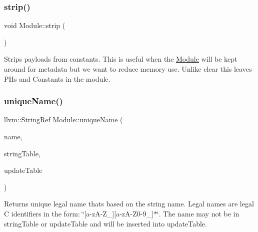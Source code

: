 \subsubsection{\texorpdfstring{strip()}{strip()}}
{\footnotesize\ttfamily void Module\+::strip (\begin{DoxyParamCaption}{ }\end{DoxyParamCaption})}

Strips payloads from constants. This is useful when the \hyperlink{classglow_1_1_module}{Module} will be kept around for metadata but we want to reduce memory use. Unlike clear this leaves P\+Hs and Constants in the module. \mbox{\label{classglow_1_1_module_a299f2b5203794b857dcb75d0ad069758}} 
\subsubsection{\texorpdfstring{unique\+Name()}{uniqueName()}}
{\footnotesize\ttfamily llvm\+::\+String\+Ref Module\+::unique\+Name (\begin{DoxyParamCaption}\item[{llvm\+::\+String\+Ref}]{name,  }\item[{const llvm\+::\+String\+Set$<$$>$ \&}]{string\+Table,  }\item[{llvm\+::\+String\+Set$<$$>$ \&}]{update\+Table }\end{DoxyParamCaption})\hspace{0.3cm}{\ttfamily [static]}}

\begin{DoxyReturn}{Returns}
unique legal name that\textquotesingle{}s based on the string {\ttfamily name}. Legal names are legal C identifiers in the form\+: \char`\"{}\mbox{[}a-\/z\+A-\/\+Z\+\_\+\mbox{]}\mbox{[}a-\/z\+A-\/\+Z0-\/9\+\_\+\mbox{]}$\ast$\char`\"{}. The name may not be in {\ttfamily string\+Table} or {\ttfamily update\+Table} and will be inserted into {\ttfamily update\+Table}. 
\end{DoxyReturn}
\mbox{\label{classglow_1_1_module_a0059ec63c41976b08ccfb50e1c8fa020}} 
